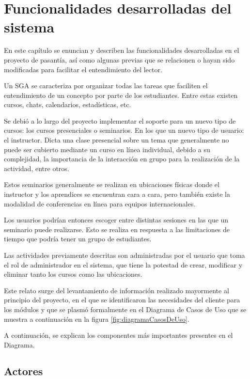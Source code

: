 \chapter{Funcionalidades desarrolladas del sistema}
\thispagestyle{empty} %
\glsresetall

En este capítulo se enuncian y describen las funcionalidades desarrolladas en el proyecto de pasantía, así como algunas previas que se relacionen o hayan sido modificadas para facilitar el entendimiento del lector.

Un \gls{SGA} se caracteriza por organizar todas las tareas que faciliten el entendimiento de un concepto por parte de los estudiantes. Entre estas existen cursos, chats, calendarios, estadísticas, etc.

Se debió a lo largo del proyecto implementar el soporte para un nuevo tipo de cursos: los cursos presenciales o seminarios. En los que un nuevo tipo de usuario: el instructor. Dicta una clase presencial sobre un tema que generalmente no puede ser cubierto mediante un curso en línea individual, debido a su complejidad, la importancia de la interacción en grupo para la realización de la actividad, entre otros.

Estos seminarios generalmente se realizan en ubicaciones físicas donde el instructor y los aprendices se encuentran cara a cara, pero también existe la modalidad de conferencias en línea para equipos internacionales.

Los usuarios podrían entonces escoger entre distintas sesiones en las que un seminario puede realizarse. Esto se realiza en respuesta a las limitaciones de tiempo que podría tener un grupo de estudiantes.

Las actividades previamente descritas son administradas por el usuario que toma el rol de administrador en el sistema, que tiene la potestad de crear, modificar y eliminar tanto los cursos como las ubicaciones.

Este relato surge del levantamiento de información realizado mayormente al principio del proyecto, en el que se identificaron las necesidades del cliente para los módulos y que se plasmó formalmente en el Diagrama de Casos de Uso que se muestra a continuación en la figura \ref{fig:diagramaCasosDeUso}.


A continuación, se explican los componentes más importantes presentes en el Diagrama.

	\section{Actores} %
	\label{sec:usuarios}

